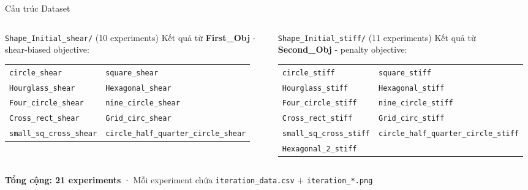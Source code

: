 \documentclass[aspectratio=169,11pt]{beamer}
\begin{document}
\begin{frame}{Cấu trúc Dataset}
  \begin{columns}[T, onlytextwidth]
      \begin{block}{\texttt{Shape\_Initial\_shear/} (10 experiments)}
        \small
        Kết quả từ \textbf{First\_Obj} - shear-biased objective:\\[4pt]
        \begin{tabular}{ll}
          \texttt{circle\_shear} & \texttt{square\_shear} \\
          \texttt{Hourglass\_shear} & \texttt{Hexagonal\_shear} \\
          \texttt{Four\_circle\_shear} & \texttt{nine\_circle\_shear} \\
          \texttt{Cross\_rect\_shear} & \texttt{Grid\_circ\_shear} \\
          \texttt{small\_sq\_cross\_shear} & \texttt{circle\_half\_quarter\_circle\_shear} \\
        \end{tabular}
      \end{block}
      \begin{block}{\texttt{Shape\_Initial\_stiff/} (11 experiments)}
        \small
        Kết quả từ \textbf{Second\_Obj} - penalty objective:\\[4pt]
        \begin{tabular}{ll}
          \texttt{circle\_stiff} & \texttt{square\_stiff} \\
          \texttt{Hourglass\_stiff} & \texttt{Hexagonal\_stiff} \\
          \texttt{Four\_circle\_stiff} & \texttt{nine\_circle\_stiff} \\
          \texttt{Cross\_rect\_stiff} & \texttt{Grid\_circ\_stiff} \\
          \texttt{small\_sq\_cross\_stiff} & \texttt{circle\_half\_quarter\_circle\_stiff} \\
          \texttt{Hexagonal\_2\_stiff} & \\
        \end{tabular}
      \end{block}
  \end{columns}
  \vspace{0.4cm}
  \begin{center}
    \textbf{Tổng cộng: 21 experiments} ·
    Mỗi experiment chứa \texttt{iteration\_data.csv} + \texttt{iteration\_*.png}
  \end{center}
\end{frame}
\end{document}
